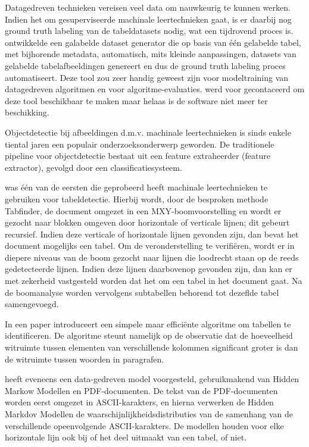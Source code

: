 Datagedreven technieken vereisen veel data om nauwkeurig te kunnen werken. Indien het om gesuperviseerde machinale leertechnieken gaat, is er daarbij nog ground truth labeling van de tabeldatasets nodig, wat een tijdrovend proces is. \textcite{Wangt2001} ontwikkelde een galabelde dataset generator die op basis van één gelabelde tabel, met bijhorende metadata, automatisch, mits kleinde aanpassingen, datasets van gelabelde tabelafbeeldingen genereert en dus de ground truth labeling proces automatiseert. Deze tool zou zeer handig geweest zijn voor modeltraining van datagedreven algoritmen en voor algoritme-evaluaties. \citeauthor{Wangt2001} werd voor gecontaceerd om deze tool beschikbaar te maken maar helaas is de software niet meer ter beschikking.

Objectdetectie bij afbeeldingen d.m.v. machinale leertechnieken is sinds enkele tiental jaren een populair onderzoeksonderwerp geworden. De traditionele pipeline voor objectdetectie bestaat uit een feature extraheerder (feature extractor), gevolgd door een classificatiesysteem.

\textcite{Cesarini2002} was één van de eersten die geprobeerd heeft machinale leertechnieken te gebruiken voor tabeldetectie. Hierbij wordt, door de besproken methode Tabfinder, de document omgezet in een MXY-boomvoorstelling en wordt er gezocht naar blokken omgeven door horizontale of verticale lijnen; dit gebeurt recursief. Indien deze verticale of horizontale lijnen gevonden zijn, dan bevat het document mogelijks een tabel. Om de veronderstelling te verifiëren, wordt er in diepere niveaus van de boom gezocht naar lijnen die loodrecht staan op de reeds gedetecteerde lijnen. Indien deze lijnen daarbovenop gevonden zijn, dan kan er met zekerheid vastgesteld worden dat het om een tabel in het document gaat. Na de boomanalyse worden vervolgens subtabellen behorend tot dezeflde tabel samengevoegd.

In een paper introduceert \textcite{Mandal2006} een simpele maar efficiënte algoritme om tabellen te identificeren. De algoritme steunt namelijk op de observatie dat de hoeveelheid witruimte tussen elementen van verschillende kolommen significant groter is dan de witruimte tussen woorden in paragrafen.

\textcite{Silva2009} heeft eveneens een data-gedreven model voorgesteld, gebruikmakend van Hidden Markow Modellen en PDF-documenten. De tekst van de PDF-documenten worden eerst omgezet in ASCII-karakters, en hierna verwerken de Hidden Markdov Modellen de waarschijnlijkheidsdistributies van de samenhang van de verschillende opeenvolgende ASCII-karakters. De modellen houden voor elke horizontale lijn ook bij of het deel uitmaakt van een tabel, of niet.

